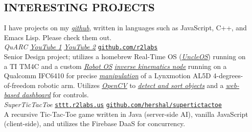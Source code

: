 \documentclass[margin]{res}
\begin{document}
\begin{resume}
  \section{INTERESTING PROJECTS}
  I have projects on my \href{https://github.com/hershal}{\ul{\sl{github}}},
  written in languages such as JavaScript, C++, and Emacs Lisp. Please
  check them out.
  \vspace{0.5em}\\
  {\sl QuARC} \hfill
  \href{https://www.youtube.com/watch?v=MEig9XBwUmU}{\sl \ul{YouTube 1}}\quad
  \href{https://www.youtube.com/watch?v=ggipd0oqxwY}{\sl \ul{YouTube 2}}\quad
  \href{https://github.com/r2labs}{\ul{\texttt{github.com/r2labs}}} \\
  Senior Design project; utilizes a homebrew Real-Time OS
  (\href{https://github.com/r2labs/uncleos}{\sl \ul{UncleOS}}) running on a TI
  TM4C and a custom \href{http://www.ros.org}{\sl \ul{Robot OS}}
  \href{https://github.com/r2labs/quarc-inverse-kinematics}{\sl \ul{inverse
      kinematics node}} running on a Qualcomm IFC6410 for precise
  \href{https://github.com/r2labs/quarc-user-interface}{\sl \ul{manipulation}}
  of a Lynxmotion AL5D 4-degrees-of-freedom robotic arm. Utilizes
  \href{http://opencv.org}{\sl\ul{OpenCV}} to
  \href{https://github.com/r2labs/quarc-vision}{\sl \ul{detect and sort
      objects}} and a \href{https://github.com/r2labs/quarc-web-interface}{\sl
    \ul{web-based dashboard}} for controls.
  \vspace{0.5em}\\
  {\sl SuperTicTacToe} \hfill
  \href{http://sttt.r2labs.us}{\ul{\texttt{sttt.r2labs.us}}}\quad
  \href{https://github.com/hershal/supertictactoe}{\ul{\texttt{github.com/hershal/supertictactoe}}} \\
  A recursive Tic-Tac-Toe game written in Java (server-side AI), vanilla
  JavaScript (client-side), and utilizes the Firebase DaaS for concurrency.


\end{resume}
\end{document}
